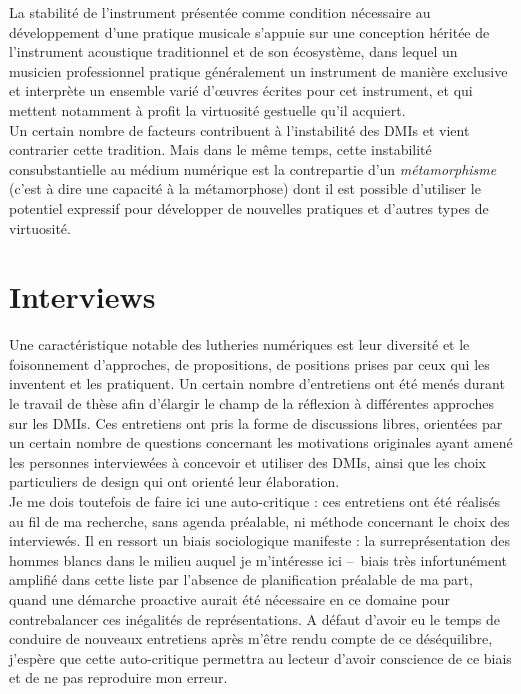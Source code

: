 \noindent La stabilité de l'instrument présentée comme condition nécessaire au développement d'une pratique musicale s'appuie sur une conception héritée de l'instrument acoustique traditionnel et de son écosystème, dans lequel un musicien professionnel pratique généralement un instrument de manière exclusive et interprète un ensemble varié d'œuvres écrites pour cet instrument, et qui mettent notamment à profit la virtuosité gestuelle qu'il acquiert.\\
\indent Un certain nombre de facteurs contribuent à l'instabilité des \glspl{DMI} et vient contrarier cette tradition. Mais dans le même temps, cette instabilité consubstantielle au médium numérique est la contrepartie d'un \textit{métamorphisme} (c'est à dire une capacité à la métamorphose) dont il est possible d'utiliser le potentiel expressif pour développer de nouvelles pratiques et d'autres types de virtuosité.



\section{Interviews}

\noindent Une caractéristique notable des lutheries numériques est leur diversité et le foisonnement d'approches, de propositions, de positions prises par ceux qui les inventent et les pratiquent. Un certain nombre d'entretiens ont été menés durant le travail de thèse afin d'élargir le champ de la réflexion à différentes approches sur les \glspl{DMI}. Ces entretiens ont pris la forme de discussions libres, orientées par un certain nombre de questions concernant les motivations originales ayant amené les personnes interviewées à concevoir et utiliser des \glspl{DMI}, ainsi que les choix particuliers de design qui ont orienté leur élaboration.\\ 
\indent Je me dois toutefois de faire ici une auto-critique : ces entretiens ont été réalisés au fil de ma recherche, sans agenda préalable, ni méthode concernant le choix des interviewés. Il en ressort un biais sociologique manifeste : la surreprésentation des hommes blancs dans le milieu auquel je m'intéresse ici --~biais très infortunément amplifié dans cette liste par l'absence de planification préalable de ma part, quand une démarche proactive aurait été nécessaire en ce domaine pour contrebalancer ces inégalités de représentations. A défaut d'avoir eu le temps de conduire de nouveaux entretiens après m'être rendu compte de ce déséquilibre, j'espère que cette auto-critique permettra au lecteur d'avoir conscience de ce biais et de ne pas reproduire mon erreur.


